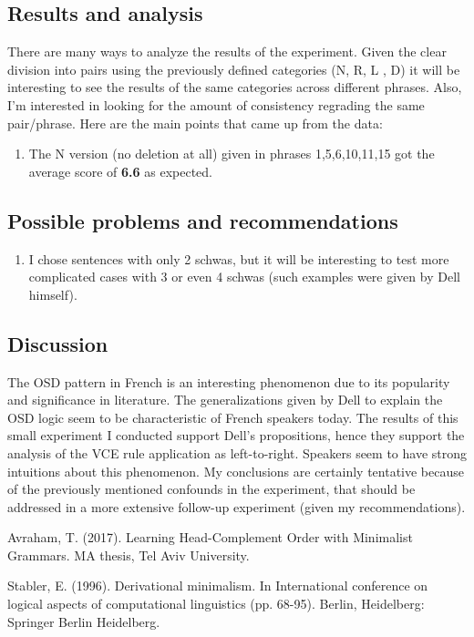 \documentclass{article}
\begin{document}
\subsection{Results and analysis}
There are many ways to analyze the results of the experiment. Given the clear division into pairs using the previously defined categories (N, R, L , D) it will be interesting to see the results of the same categories across different phrases.  Also,  I'm interested in looking for the amount of consistency regrading the same pair/phrase.  Here are the main points that came up from the data:
\begin{enumerate}
  \item The N version (no deletion at all) given in phrases 1,5,6,10,11,15 got the average score of \textbf{6.6} as expected.
\end{enumerate}

\subsection{Possible problems and recommendations}
\begin{enumerate}
  \item I chose sentences with only 2 schwas, but it will be interesting to test more complicated cases with 3 or even 4 schwas (such examples were given by Dell himself).
\end{enumerate}

\subsection{Discussion}
The OSD pattern in French is an interesting phenomenon due to its popularity and significance in literature. The generalizations given by Dell to explain the OSD logic seem to be characteristic of French speakers today. The results of this small experiment I conducted support Dell's propositions, hence they support the analysis of the VCE rule application as left-to-right. Speakers seem to have strong intuitions about this phenomenon.
My conclusions are certainly tentative because of the previously mentioned confounds in the experiment,  that should be addressed in a more extensive follow-up experiment (given my recommendations).

\clearpage
\fancyhead{} %

\begin{thebibliography}{} %

Avraham, T. (2017). 
Learning Head-Complement Order with Minimalist Grammars.
MA thesis, Tel Aviv University.


Stabler, E. (1996). 
Derivational minimalism. In International conference on logical aspects of computational linguistics (pp. 68-95). 
Berlin, Heidelberg: Springer Berlin Heidelberg.


\end{thebibliography}
\end{document}
